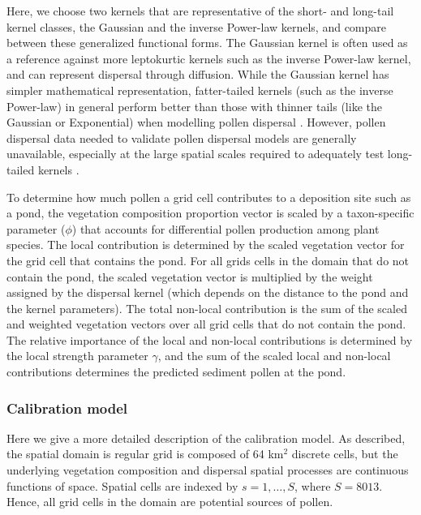\documentclass[12pt]{article}
\begin{document}
Here, we choose two kernels that are representative of the short- and
long-tail kernel classes, the Gaussian and the inverse Power-law
kernels, and compare between these generalized functional forms. The
Gaussian kernel is often used as a reference against more leptokurtic
kernels such as the inverse Power-law kernel, and can represent
dispersal through diffusion. While the Gaussian kernel has simpler
mathematical representation, fatter-tailed kernels (such as the
inverse Power-law) in general perform better than those with thinner
tails (like the Gaussian or Exponential) when modelling pollen
dispersal \citep{devaux2007modelling, austerlitz2004using}. However,
pollen dispersal data needed to validate pollen dispersal models are
generally unavailable, especially at the large spatial scales required
to adequately test long-tailed kernels \citep{clobert2012dispersal}.


To determine how much pollen a grid cell contributes to a deposition
site such as a pond, the vegetation composition proportion vector is
scaled by a taxon-specific parameter ($\phi$) that accounts for
differential pollen production among plant species. The local
contribution is determined by the scaled vegetation vector for the
grid cell that contains the pond. For all grids cells in the domain
that do not contain the pond, the scaled vegetation vector is
multiplied by the weight assigned by the dispersal kernel (which
depends on the distance to the pond and the kernel parameters). The
total non-local contribution is the sum of the scaled and weighted
vegetation vectors over all grid cells that do not contain the
pond. The relative importance of the local and non-local contributions
is determined by the local strength parameter $\gamma$, and the sum of
the scaled local and non-local contributions determines the predicted
sediment pollen at the pond.

\subsubsection{Calibration model}

Here we give a more detailed description of the calibration model. As
described, the spatial domain is regular grid is composed of 64 km$^2$
discrete cells, but the underlying vegetation composition and
dispersal spatial processes are continuous functions of space. Spatial
cells are indexed by $s=1,\ldots,S$, where $S=8013$. Hence, all grid
cells in the domain are potential sources of pollen.
\end{document}
